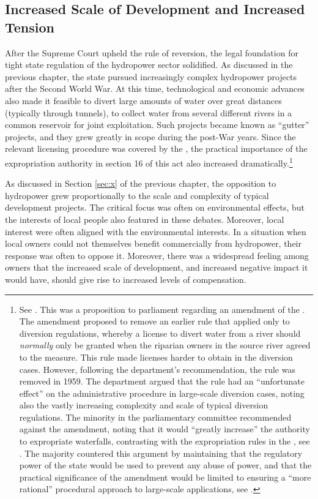 \subsection{Increased Scale of Development and Increased Tension}

After the Supreme Court upheld the rule of reversion, the legal foundation for tight state regulation of the hydropower sector solidified. As discussed in the previous chapter, the state pursued increasingly complex hydropower projects after the Second World War. At this time, technological and economic advances also made it feasible to divert large amounts of water over great distances (typically through tunnels), to collect water from several different rivers in a common reservoir for joint exploitation. Such projects became known as ``gutter'' projects, and they grew greatly in scope during the post-War years. Since the relevant licensing procedure was covered by the \cite{wra17}, the practical importance of the expropriation authority in section 16 of this act also increased dramatically.\footnote{See \cite[11]{innst59}. This was a proposition to parliament regarding an amendment of the \cite{wra17}. The amendment proposed to remove an earlier rule that applied only to diversion regulations, whereby a license to divert water from a river should {\it normally} only be granted when the riparian owners in the source river agreed to the measure. This rule made licenses harder to obtain in the diversion cases. However, following the department's recommendation, the rule was removed in 1959. The department argued that the rule had an ``unfortunate effect'' on the administrative procedure in large-scale diversion cases, noting also the vastly increasing complexity and scale of typical diversion regulations. The minority in the parliamentary committee recommended against the amendment, noting that it would ``greatly increase'' the authority to expropriate waterfalls, contrasting with the expropriation rules in the \cite{wra40}, see \cite[14]{innst59}. The majority countered this argument by maintaining that the regulatory power of the state would be used to prevent any abuse of power, and that the practical significance of the amendment would be limited to ensuring a ``more rational'' procedural approach to large-scale applications, see \cite[14]{innst59}.}

As discussed in Section \ref{sec:x} of the previous chapter, the opposition to hydropower grew proportionally to the scale and complexity of typical development projects. The critical focus was often on environmental effects, but the interests of local people also featured in these debates. 
Moreover, local interest were often aligned with the environmental interests. In a situation when local owners could not themselves benefit commercially from hydropower, their response was often to oppose 
it. Moreover, there was a widespread feeling among owners that the increased scale of development, and increased negative impact it would have, should give rise to increased levels of compensation.


